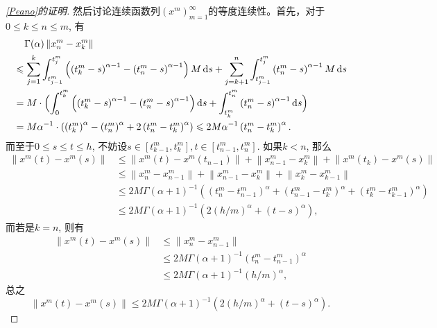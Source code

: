 \begin{proof}[\cref{Peano}的证明]
    然后讨论连续函数列$\left(x^m\right)_{m=1}^\infty$的等度连续性。首先，对于$0\leqslant k\leqslant n\leqslant m$, 有
    \begin{align*}
        &\relphantom{\leqslant}\Gamma(\alpha)\left\| x^m_n-x^m_k \right\|
        \\ &\leqslant \sum_{j=1}^{k}\int_{t^m_{j-1}}^{t^m_j}\left(\left(t^m_k-s\right)^{\alpha-1}-\left(t^m_n-s\right)^{\alpha-1}\right)M\differential s+\sum_{j=k+1}^{n}\int_{t^m_{j-1}}^{t^m_j}\left(t^m_n-s\right)^{\alpha-1}M\differential s
        \\ &=M\cdot\Bigl(\int_{0}^{t^m_k}\left(\left(t^m_k-s\right)^{\alpha-1}-\left(t^m_n-s\right)^{\alpha-1}\right)\differential s+\int_{t^m_k}^{t^m_n}\left(t^m_n-s\right)^{\alpha-1}\differential s\Bigr)
        \\ &=M\alpha^{-1}\cdot \left(\left(t^m_k\right) ^\alpha-\left(t^m_n\right)^\alpha+2\left(t^m_n-t^m_k\right)^\alpha\right)\leqslant 2M\alpha^{-1}\left(t^m_n-t^m_k\right)^\alpha.
    \end{align*}
    而至于$0\leqslant s\leqslant t\leqslant h$, 不妨设$s\in\left[t^m_{k-1},t^m_k\right],t\in\left[t^m_{n-1},t^m_n\right]$. 如果$k<n$, 那么
    \begin{align*}
        \left\| x^m(t)-x^m(s) \right\|
        &\leqslant \left\| x^m(t)-x^m(t_{n-1}) \right\|+\left\| x^m_{n-1}-x^m_k \right\|+\left\| x^m(t_k)-x^m(s) \right\|
        \\ &\leqslant \left\|x^m_{n}-x^m_{n-1}\right\|+\left\| x^m_{n-1}-x^m_k \right\|+\left\|x^m_{k}-x^m_{k-1}\right\|
        \\ &\leqslant 2M\Gamma(\alpha+1)^{-1}\left(\left(t^m_n-t^m_{n-1}\right)^\alpha + \left( t^m_{n-1}-t^m_{k}\right)^\alpha + \left(t^m_k-t^m_{k-1}\right)^\alpha\right)
        \\ &\leqslant 2M\Gamma(\alpha+1)^{-1}\left(2(h/m)^\alpha+(t-s)^\alpha\right),
    \end{align*}
    而若是$k=n$, 则有
    \begin{align*}
        \left\| x^m(t)-x^m(s) \right\| &\leqslant \left\|x^m_{n}-x^m_{n-1}\right\|
        \\ &\leqslant 2M\Gamma(\alpha+1)^{-1}\left(t^m_n-t^m_{n-1}\right)^\alpha
        \\ &\leqslant 2M\Gamma(\alpha+1)^{-1}(h/m)^\alpha,
    \end{align*}
    总之
    \begin{equation}\label{xmts}
        \left\| x^m(t)-x^m(s) \right\| \leqslant 2M\Gamma(\alpha+1)^{-1}\left(2(h/m)^\alpha+(t-s)^\alpha\right).

\end{equation}
\end{proof}
